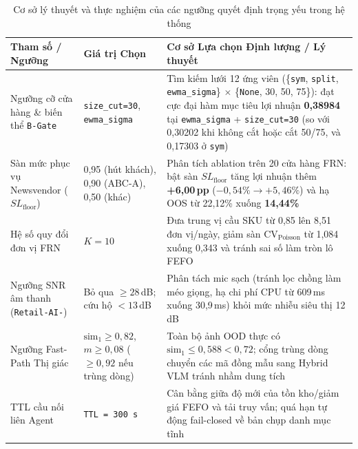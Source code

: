 \begin{table}[H]
\centering
\caption{Cơ sở lý thuyết và thực nghiệm của các ngưỡng quyết định trọng yếu trong hệ thống}
\label{tab:threshold_justification}
\footnotesize
\begin{tabularx}{\textwidth}{L{3.5cm} L{2.3cm} Y}
\toprule
\textbf{Tham số / Ngưỡng} & \textbf{Giá trị Chọn} & \textbf{Cơ sở Lựa chọn Định lượng / Lý thuyết} \\
\midrule
Ngưỡng cỡ cửa hàng \& biến thể \texttt{B-Gate} & \texttt{size\_cut=30}, \texttt{ewma\_sigma} & Tìm kiếm lưới 12 ứng viên (\{\texttt{sym}, \texttt{split}, \texttt{ewma\_sigma}\} $\times$ \{\texttt{None}, 30, 50, 75\}): đạt cực đại hàm mục tiêu lợi nhuận \textbf{0,38984} tại \texttt{ewma\_sigma} + \texttt{size\_cut=30} (so với 0,30202 khi không cắt hoặc cắt 50/75, và 0,17303 ở \texttt{sym}) \\
Sàn mức phục vụ Newsvendor ($SL_{\text{floor}}$) & 0,95 (hút khách), 0,90 (ABC-A), 0,50 (khác) & Phân tích ablation trên 20 cửa hàng FRN: bật sàn $SL_{\text{floor}}$ tăng lợi nhuận thêm \textbf{+6,00\,pp} ($-0{,}54\% \to +5{,}46\%$) và hạ OOS từ 22,12\% xuống \textbf{14,44\%} \\
Hệ số quy đổi đơn vị FRN & $K = 10$ & Đưa trung vị cầu SKU từ 0,85 lên 8,51 đơn vị/ngày, giảm sàn $\text{CV}_{\text{Poisson}}$ từ 1,084 xuống 0,343 và tránh sai số làm tròn lô FEFO \\
Ngưỡng SNR âm thanh (\texttt{Retail-AI-}) & Bỏ qua $\ge 28$\,dB; cứu hộ $< 13$\,dB & Phân tách mic sạch (tránh lọc chồng làm méo giọng, hạ chi phí CPU từ 609\,ms xuống 30,9\,ms) khỏi mức nhiễu siêu thị 12\,dB \\
Ngưỡng Fast-Path Thị giác & $\text{sim}_1 \ge 0{,}82$, $m \ge 0{,}08$ ($\ge 0{,}92$ nếu trùng dòng) & Toàn bộ ảnh OOD thực có $\text{sim}_1 \le 0{,}588 < 0{,}72$; cổng trùng dòng chuyển các mã đồng mẫu sang Hybrid VLM tránh nhầm dung tích \\
TTL cầu nối liên Agent & \texttt{TTL = 300\,s} & Cân bằng giữa độ mới của tồn kho/giảm giá FEFO và tải truy vấn; quá hạn tự động fail-closed về bản chụp danh mục tĩnh \\
\bottomrule
\end{tabularx}
\end{table}
